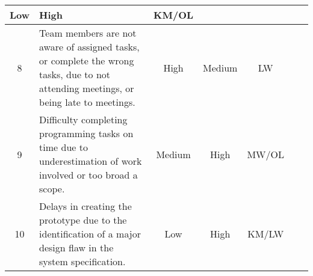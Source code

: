 \begin{table}[h!]
\begin{tabularx}{\textwidth}{|c|X|c|c|c|l|l|}
            Low & 
            High & KM/OL & \\
            \hline
            8 & 
            Team members are not aware of assigned tasks, or complete the wrong tasks, due to not attending meetings, or being late to meetings. &
            High & 
            Medium & 
            LW & \\
            \hline
            9 & 
            Difficulty completing programming tasks on time due to underestimation of work involved or too broad a scope. & 
            Medium & 
            High & 
            MW/OL & \\
            \hline
            10 & 
            Delays in creating the prototype due to the identification of a major design flaw in the system specification. & 
            Low & 
            High & 
            KM/LW & \\
            \hline
        \end{tabularx}
    
    \end{table}